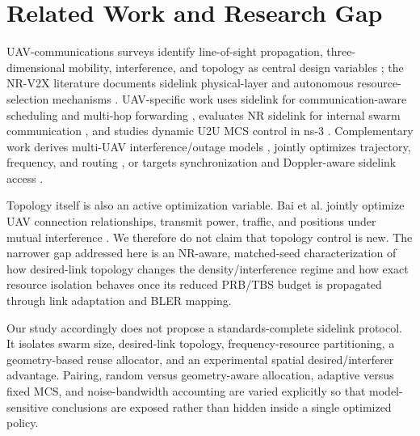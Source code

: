 \section{Related Work and Research Gap}
UAV-communications surveys identify line-of-sight propagation, three-dimensional mobility, interference, and topology as central design variables \cite{zeng2019sky,mozaffari2019tutorial}; the NR-V2X literature documents sidelink physical-layer and autonomous resource-selection mechanisms \cite{garcia2021nrv2x}. UAV-specific work uses sidelink for communication-aware scheduling and multi-hop forwarding \cite{mishra2022cu2x}, evaluates NR sidelink for internal swarm communication \cite{varonen2024sidelink}, and studies dynamic U2U MCS control in ns-3 \cite{yu2025uavlink}. Complementary work derives multi-UAV interference/outage models \cite{lau2023outage}, jointly optimizes trajectory, frequency, and routing \cite{alam2024jtfr}, or targets synchronization and Doppler-aware sidelink access \cite{zhang2026sync}.

Topology itself is also an active optimization variable. Bai et al. jointly optimize UAV connection relationships, transmit power, traffic, and positions under mutual interference \cite{bai2026topology}. We therefore do not claim that topology control is new. The narrower gap addressed here is an NR-aware, matched-seed characterization of how desired-link topology changes the density/interference regime and how exact resource isolation behaves once its reduced PRB/TBS budget is propagated through link adaptation and BLER mapping.

Our study accordingly does not propose a standards-complete sidelink protocol. It isolates swarm size, desired-link topology, frequency-resource partitioning, a geometry-based reuse allocator, and an experimental spatial desired/interferer advantage. Pairing, random versus geometry-aware allocation, adaptive versus fixed MCS, and noise-bandwidth accounting are varied explicitly so that model-sensitive conclusions are exposed rather than hidden inside a single optimized policy.
